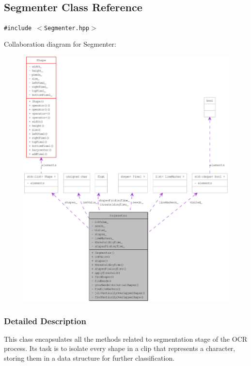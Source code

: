 \hypertarget{class_segmenter}{
\subsection{Segmenter Class Reference}
\label{class_segmenter}
}
{\tt \#include $<$Segmenter.hpp$>$}

Collaboration diagram for Segmenter:\nopagebreak
\begin{figure}[H]
\begin{center}
\leavevmode
\includegraphics[width=400pt]{class_segmenter__coll__graph}
\end{center}
\end{figure}


\subsubsection{Detailed Description}
This class encapsulates all the methods related to segmentation stage of the OCR process. Its task is to isolate every shape in a clip that represents a character, storing them in a data structure for further classification.

